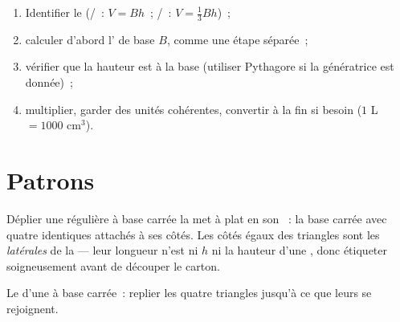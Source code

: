 \begin{method}\label{met:g8:solids:method}
\begin{enumerate}
  \item Identifier le  (/~: $V = Bh$~;
        /~: $V = \frac13 Bh$)~;
  \item calculer d'abord l' de base $B$, comme une étape
        séparée~;
  \item vérifier que la hauteur est  à la base
        (utiliser Pythagore si la génératrice est donnée)~;
  \item multiplier, garder des unités cohérentes, convertir à la fin
        si besoin ($1$ L $= 1000$ cm$^3$).
\end{enumerate}
\end{method}

\section{Patrons}

\begin{example}\label{ex:g8:solids:net}
Déplier une  régulière à base carrée la met à plat en son
\emph{}~: la base carrée avec quatre 
identiques attachés à ses côtés. Les côtés égaux des triangles sont
les \emph{ latérales} de la  --- leur longueur n'est ni
$h$ ni la hauteur d'une , donc étiqueter soigneusement avant de
découper le carton.
\end{example}

\begin{omfigure}

{\small Le  d'une  à base carrée~: replier les quatre
triangles jusqu'à ce que leurs  se rejoignent.}
\end{omfigure}

